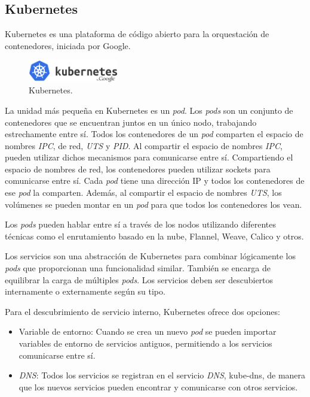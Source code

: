 \subsection{Kubernetes}

Kubernetes es una plataforma de código abierto para la orquestación de contenedores, iniciada por Google.

\begin{figure}[H]
\centering
\includegraphics[width=0.35\textwidth]{images/figures/kubernetes.png}
\caption{Kubernetes.\label{fig:figure_placement_example}}
\end{figure}

La unidad más pequeña en Kubernetes es un \textit{pod}. Los \textit{pods} son un conjunto de contenedores que se encuentran juntos en un único nodo, trabajando estrechamente entre sí. Todos los contenedores de un \textit{pod} comparten el espacio de nombres \textit{IPC}, de red, \textit{UTS} y \textit{PID}. Al compartir el espacio de nombres \textit{IPC}, pueden utilizar dichos mecanismos para comunicarse entre sí. Compartiendo el espacio de nombres de red, los contenedores pueden utilizar sockets para comunicarse entre sí. Cada \textit{pod} tiene una dirección IP y todos los contenedores de ese \textit{pod} la comparten. Además, al compartir el espacio de nombres \textit{UTS}, los volúmenes se pueden montar en un \textit{pod} para que todos los contenedores los vean.

Los \textit{pods} pueden hablar entre sí a través de los nodos utilizando diferentes técnicas como el enrutamiento basado en la nube, Flannel, Weave, Calico y otros.

Los servicios son una abstracción de Kubernetes para combinar lógicamente los \textit{pods} que proporcionan una funcionalidad similar. También se encarga de equilibrar la carga de múltiples \textit{pods}. Los servicios deben ser descubiertos internamente o externamente según su tipo.

Para el descubrimiento de servicio interno, Kubernetes ofrece dos opciones:
\begin{itemize}
\item Variable de entorno: Cuando se crea un nuevo \textit{pod} se pueden importar variables de entorno de servicios antiguos, permitiendo a los servicios comunicarse entre sí.
\item \textit{DNS}: Todos los servicios se registran en el servicio \textit{DNS}, kube-dns, de manera que los nuevos servicios pueden encontrar y comunicarse con otros servicios.
\end{itemize}

